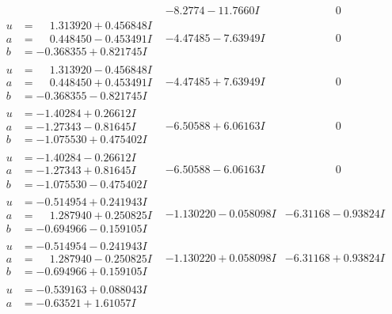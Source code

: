\documentclass[1p]{elsarticle_modified}
\theoremstyle{definition}
\begin{document}
$$\begin{array}{c|c|c}
 & -8.2774 - 11.7660 I & \phantom{-0.000000 } 0 \\ \hline\begin{aligned}
u &= \phantom{-}1.313920 + 0.456848 I \\
a &= \phantom{-}0.448450 - 0.453491 I \\
b &= -0.368355 + 0.821745 I\end{aligned}
 & -4.47485 - 7.63949 I & \phantom{-0.000000 } 0 \\ \hline\begin{aligned}
u &= \phantom{-}1.313920 - 0.456848 I \\
a &= \phantom{-}0.448450 + 0.453491 I \\
b &= -0.368355 - 0.821745 I\end{aligned}
 & -4.47485 + 7.63949 I & \phantom{-0.000000 } 0 \\ \hline\begin{aligned}
u &= -1.40284 + 0.26612 I \\
a &= -1.27343 - 0.81645 I \\
b &= -1.075530 + 0.475402 I\end{aligned}
 & -6.50588 + 6.06163 I & \phantom{-0.000000 } 0 \\ \hline\begin{aligned}
u &= -1.40284 - 0.26612 I \\
a &= -1.27343 + 0.81645 I \\
b &= -1.075530 - 0.475402 I\end{aligned}
 & -6.50588 - 6.06163 I & \phantom{-0.000000 } 0 \\ \hline\begin{aligned}
u &= -0.514954 + 0.241943 I \\
a &= \phantom{-}1.287940 + 0.250825 I \\
b &= -0.694966 - 0.159105 I\end{aligned}
 & -1.130220 - 0.058098 I & -6.31168 - 0.93824 I \\ \hline\begin{aligned}
u &= -0.514954 - 0.241943 I \\
a &= \phantom{-}1.287940 - 0.250825 I \\
b &= -0.694966 + 0.159105 I\end{aligned}
 & -1.130220 + 0.058098 I & -6.31168 + 0.93824 I \\ \hline\begin{aligned}
u &= -0.539163 + 0.088043 I \\
a &= -0.63521 + 1.61057 I \\

\end{aligned}
\end{array}$$
\end{document}
